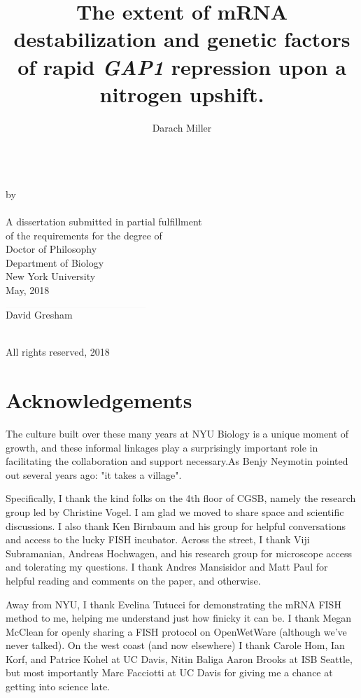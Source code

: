 \documentclass[12pt,letterpaper]{memoir}
\title{
The extent of mRNA destabilization and 
genetic factors of rapid \textit{GAP1} repression 
upon a nitrogen upshift.
}
\author{Darach Miller}
\makeatletter
\def\makemytitle{
  \newpage
\begin{center}
\vfill
  \@title\\
\vfill
  by\\
\vfill
  \@author\\
\vfill
  A dissertation submitted in partial fulfillment \\
  of the requirements for the degree of \\
  Doctor of Philosophy \\
  Department of Biology \\
  New York University \\
\vfill
  \monthz, \yearz\\
  \end{center}
\vfill
\begin{flushright}
  $\rule{5cm}{0.01mm}$\\
  David Gresham
\end{flushright}
  \pagebreak
\begin{center}
  \textcopyright \hspace{0.2em} \@author \\
  All rights reserved, \yearz \\
\end{center}
  \pagebreak
}
\def\monthz{May}
\def\yearz{2018}
\makeatother
\begin{document}
\DoubleSpacing
\frontmatter
\pagestyle{empty}

\makemytitle

\iffalse
\begin{quote}
\SingleSpace
"Science is a match that a person has just got alight. 
They thought they were in a room --- 
in moments of devotion, a temple --- 
and that this light would be reflected from and display walls 
inscribed with wonderful secrets and pillars carved with 
philosophical systems wrought into harmony. 
\vfill
It is a curious sensation, now that the preliminary splutter is 
over and the flame burns up clear, to see lit just their hands and 
just a glimpse of themselves and the patch they stand on visible, and 
around them, in place of all that comfort and beauty they
anticipated, \vspace{0.5em} darkness still."

\hfill - H.G. Wells, 1891, \\\vspace{1em}\hfill adapted for 2018
\end{quote}
\fi

\newpage

\section*{Acknowledgements}

\label{section:acknow}

\iffalse


The culture built over these many years at NYU Biology is a unique 
moment of growth, and these informal linkages play a surprisingly
important role in facilitating the collaboration and support
necessary.As Benjy Neymotin 
pointed out several years ago: "it takes a village".

Specifically,
I thank the kind folks on the 4th floor of CGSB, namely
the research group led by Christine Vogel. I am glad we moved to share
space and scientific discussions.
I also thank Ken Birnbaum and his group for helpful conversations and
access to the lucky FISH incubator.
Across the street, I thank Viji Subramanian, Andreas Hochwagen, 
and his research group for microscope access and tolerating my
questions.
I thank Andres Mansisidor and Matt Paul for helpful reading and 
comments on the paper, and otherwise.

Away from NYU, I thank
Evelina Tutucci for demonstrating the mRNA FISH method to me,
helping me understand just how finicky it can be.
I thank Megan McClean for openly sharing a FISH protocol on
OpenWetWare (although we've never talked).
On the west coast (and now elsewhere) I thank Carole Hom, Ian Korf, 
and Patrice Kohel at UC Davis, Nitin Baliga Aaron Brooks at ISB
Seattle, but most importantly Marc Facciotti at UC Davis for 
giving me a chance at getting into science late.
\end{document}
